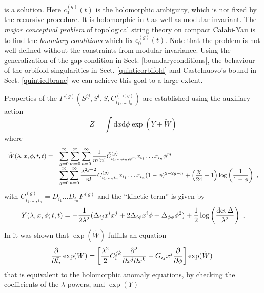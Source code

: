 \documentclass[12pt]{article}
\newcommand{\ds}{\displaystyle}
\def\dd{\mathrm{d}}
\begin{document}
is a solution. Here $c^{(g)}_0(t)$ is the holomorphic ambiguity,
which is not fixed by the recursive procedure. It is holomorphic
in $t$ as well as modular invariant. The {\sl major conceptual
problem} of topological string theory on compact Calabi-Yau is to
find the {\sl boundary conditions} which fix $c^{(g)}_0(t)$. Note
that the problem is not well defined without the constraints from
modular invariance. Using the generalization of the gap condition
in Sect. \ref{boundaryconditions}, the behaviour of the orbifold
singularities in Sect. \ref{quinticorbifold} and Castelnuovo's
bound in Sect. \ref{quinticdbrane} we can achieve this goal to a
large extent.


Properties of the $\Gamma^{(g)}(S^{ij},S^i,S,
C^{(<g)}_{i_1,\ldots,i_n})$ are established using the auxiliary
action
\begin{equation}
Z=\int \dd x \dd \phi \exp(Y+\tilde W)
\label{auxilliaryaction}
\end{equation}
where
\begin{equation}
\begin{array}{rl}
\tilde W(\lambda,x,\phi,t,\bar t)=&\ds{\sum_{g=0}^\infty \sum_{m=0}^\infty
\sum_{n=0}^\infty {1\over m! n!} \tilde C^{(g)}_{i_1,\ldots,i_n,\phi^{m}}
x_{i_1}\ldots x_{i_n} \phi^m}\\
=&\ds{\sum_{g=0}^\infty  \sum_{n=0}^\infty
{\lambda^{2g -2}\over n!} C^{(g)}_{i_1,\ldots,i_n}x_{i_1}\ldots x_{i_n}(1-\phi)^{2-2g-n}}+\left({\chi\over 24}-1\right)
\log\left(1\over {1-\phi}\right) \ ,
\end{array}
\end{equation}
with $C^{(g)}_{i_1,\ldots,i_n}=D_{i_1}\ldots D_{i_n} F^{(g)}$  and
the ``kinetic term'' is given by
\begin{equation}
Y(\lambda , x, \phi;t,\bar t)=-{1\over 2 \lambda^2}
(\Delta_{ij}x^i x^j+ 2 \Delta_{i\phi}x^i \phi +\Delta_{\phi\phi}
\phi^2) + {1\over 2} \log\left(\det \Delta\over \lambda^2\right)\ .
\end{equation}
In \cite{BCOV} it was shown that $\exp(\tilde W)$ fulfills an
equation
\begin{equation}
{\partial \over \partial {\bar t_i}} \exp(\tilde W) =\left[ {\lambda ^2\over 2}
\bar C^{jk}_{\bar \imath} {\partial^2 \over \partial x^j \partial x^k} -
G_{\bar \imath j}  x^j {\partial \over \partial \phi} \right]\exp(\tilde W)\
\label{linearanomaly}
\end{equation}
that is equivalent to the holomorphic anomaly equations, by
checking the coefficients of the $\lambda$ powers, and $\exp(Y)$
\end{document}
